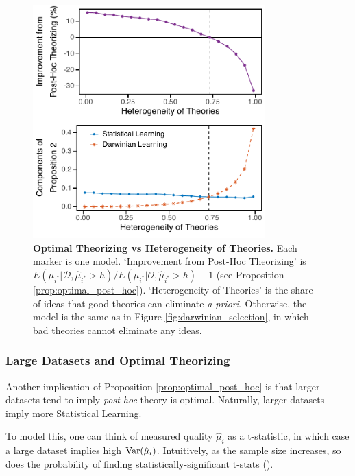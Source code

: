 \documentclass[12pt,english]{article}
\theoremstyle{plain}
\theoremstyle{plain}
\begin{document}
\begin{figure}
    \centering
    \includegraphics[width=0.8\textwidth]{exhibits/many-qgood.pdf}
    \caption{\textbf{Optimal Theorizing vs Heterogeneity of Theories.} Each marker is one model. `Improvement from Post-Hoc Theorizing' is $E\left(\mu_{i^{\ast}}|\mathcal{D}, \hat{\mu}_{i^{\ast}}>h\right)/E\left(\mu_{i^{\ast}}|\mathcal{O}, \hat{\mu}_{i^{\ast}}>h\right)-1$ (see Proposition \ref{prop:optimal_post_hoc}). `Heterogeneity of Theories' is the share of ideas that good theories can eliminate \emph{a priori}. Otherwise, the model is the same as in Figure \ref{fig:darwinian_selection}, in which bad theories cannot eliminate any ideas.}
    \label{fig:prop2-het}
\end{figure}

\subsubsection{Large Datasets and Optimal Theorizing}\label{sec:het-bigdata}

Another implication of Proposition \ref{prop:optimal_post_hoc} is that larger datasets tend to imply \emph{post hoc} theory is optimal. Naturally, larger datasets imply more Statistical Learning. 

To model this, one can think of measured quality $\hat{\mu}_i$ as a t-statistic, in which case a large dataset implies high $\text{Var}(\hat{\mu}_i)$.  Intuitively, as the sample size increases, so does the probability of finding statistically-significant t-stats (\citealt{abadie2020statistical}). 
\end{document}
